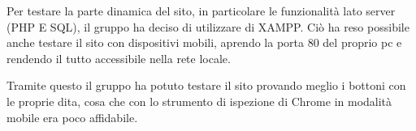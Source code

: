 Per testare la parte dinamica del sito, in particolare le funzionalità lato server (PHP E SQL), il gruppo ha deciso di utilizzare di XAMPP. Ciò ha reso possibile
anche testare il sito con dispositivi mobili, aprendo la porta 80 del proprio pc e rendendo il tutto accessibile nella rete locale.

Tramite questo il gruppo ha potuto testare il sito provando meglio i bottoni con le proprie dita, cosa che con lo strumento di ispezione di Chrome in modalità mobile era poco affidabile.